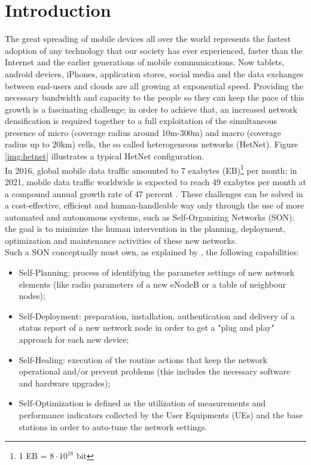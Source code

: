 \documentclass[conference,10pt]{IEEEtran}
\begin{document}
\section{Introduction}\label{sec:intro}
The great spreading of mobile devices all over the world represents the fastest adoption of any technology that
our society has ever experienced, faster than the Internet and the earlier generations of mobile
communications. Now tablets, android devices, iPhones, application stores, social media and the data
exchanges between end-users and clouds are all growing at exponential speed. Providing the necessary bandwidth and capacity to the people so they can keep the pace of this growth is a fascinating challenge; in order to achieve that, an increased network densification is required together to a full exploitation of the simultaneous presence of micro (coverage radius around 10m-300m) and macro (coverage radius up to 20km) cells, the so called heterogeneous networks (HetNet). Figure \ref{img:hetnet} illustrates a typical HetNet configuration.\\
In 2016, global mobile data traffic amounted to 7 exabytes (EB)\footnote{1 EB = $8\cdot 10^{18}$ bit} per month; in 2021, mobile data traffic worldwide is expected to reach 49 exabytes per month at a compound annual growth rate of 47 percent \cite{indexglobal}.
These challenges can be solved in a cost-effective, efficient and human-handleable way only through the use of more automated and autonomous systems, such as Self-Organizing Networks (SON): the goal is to minimize the human intervention in the planning, deployment, optimization and maintenance activities of these new networks.\\
Such a SON conceptually must own, as explained by \cite{ramiro2011self}, the following capabilities:
\begin{itemize}
\item Self-Planning: process of identifying the parameter settings of new network elements (like radio parameters of a new eNodeB or a table of neighbour nodes);
\item Self-Deployment: preparation, installation, authentication and delivery of a status report of
a new network node in order to get a "plug and play" approach for each new device;
\item Self-Healing: execution of the routine actions that keep the network operational and/or
prevent problems (this includes the necessary software and hardware upgrades);
\item Self-Optimization is defined as the utilization of measurements and performance indicators
collected by the User Equipments (UEs) and the base stations in order to auto-tune the network
settings.
\end{itemize}
\end{document}
